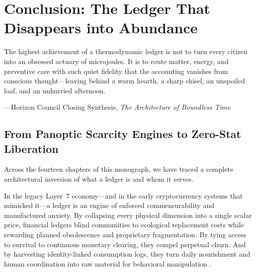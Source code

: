 \chapter{Conclusion: The Ledger That Disappears into Abundance}
\label{ch:conclusion-abundance}

\epigraph{The highest achievement of a thermodynamic ledger is not to turn every citizen into an obsessed actuary of microjoules. It is to route matter, energy, and preventive care with such quiet fidelity that the accounting vanishes from conscious thought---leaving behind a warm hearth, a sharp chisel, an unspoiled loaf, and an unhurried afternoon.}{---Horizon Council Closing Synthesis, \textit{The Architecture of Boundless Time}}

\section{From Panoptic Scarcity Engines to Zero-Stat Liberation}
\label{sec:ch14-synthesis}

Across the fourteen chapters of this monograph, we have traced a complete architectural inversion of what a ledger is and whom it serves.

In the legacy Layer~7 economy---and in the early cryptocurrency systems that mimicked it---a ledger is an engine of enforced commensurability and manufactured anxiety. By collapsing every physical dimension into a single scalar price, financial ledgers blind communities to ecological replacement costs while rewarding planned obsolescence and proprietary fragmentation. By tying access to survival to continuous monetary clearing, they compel perpetual churn. And by harvesting identity-linked consumption logs, they turn daily nourishment and human coordination into raw material for behavioral manipulation \parencite{kapp1950social,zuboff2019}.

